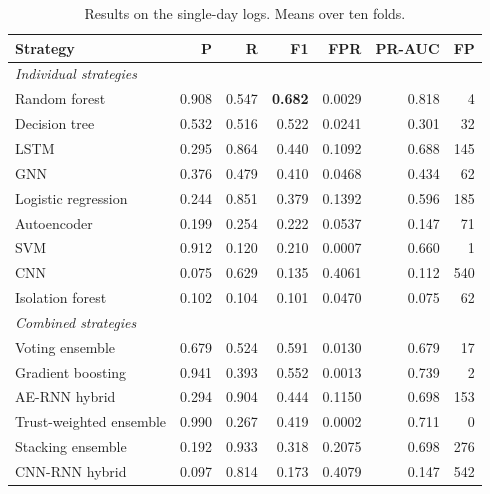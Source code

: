 \begin{table}[H]
\centering
\small
\begin{tabular}{lrrrrrr}
\toprule
Strategy & P & R & F1 & FPR & PR-AUC & FP \\
\midrule
\multicolumn{7}{l}{\textit{Individual strategies}} \\
Random forest & 0.908 & 0.547 & \textbf{0.682} & 0.0029 & 0.818 & 4 \\
Decision tree & 0.532 & 0.516 & 0.522 & 0.0241 & 0.301 & 32 \\
LSTM & 0.295 & 0.864 & 0.440 & 0.1092 & 0.688 & 145 \\
GNN & 0.376 & 0.479 & 0.410 & 0.0468 & 0.434 & 62 \\
Logistic regression & 0.244 & 0.851 & 0.379 & 0.1392 & 0.596 & 185 \\
Autoencoder & 0.199 & 0.254 & 0.222 & 0.0537 & 0.147 & 71 \\
SVM & 0.912 & 0.120 & 0.210 & 0.0007 & 0.660 & 1 \\
CNN & 0.075 & 0.629 & 0.135 & 0.4061 & 0.112 & 540 \\
Isolation forest & 0.102 & 0.104 & 0.101 & 0.0470 & 0.075 & 62 \\
\midrule
\multicolumn{7}{l}{\textit{Combined strategies}} \\
Voting ensemble & 0.679 & 0.524 & 0.591 & 0.0130 & 0.679 & 17 \\
Gradient boosting & 0.941 & 0.393 & 0.552 & 0.0013 & 0.739 & 2 \\
AE-RNN hybrid & 0.294 & 0.904 & 0.444 & 0.1150 & 0.698 & 153 \\
Trust-weighted ensemble & 0.990 & 0.267 & 0.419 & 0.0002 & 0.711 & 0 \\
Stacking ensemble & 0.192 & 0.933 & 0.318 & 0.2075 & 0.698 & 276 \\
CNN-RNN hybrid & 0.097 & 0.814 & 0.173 & 0.4079 & 0.147 & 542 \\
\bottomrule
\end{tabular}
\caption{Results on the single-day logs. Means over ten folds.}
\label{tab:results-single-day}
\end{table}
